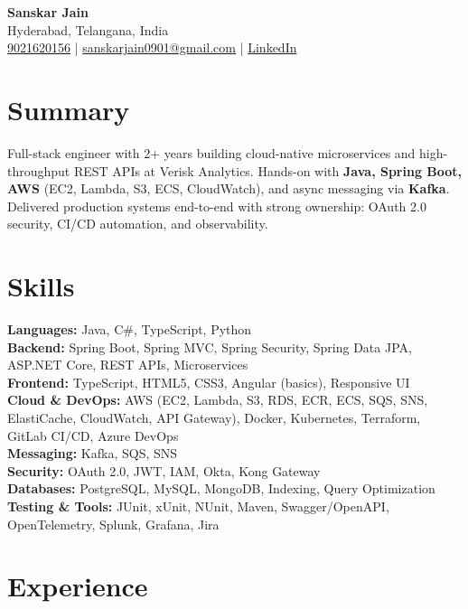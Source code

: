 \documentclass[a4paper,10pt]{article}
\begin{document}
\begin{center}
    {\LARGE \textbf{Sanskar Jain}} \\
    Hyderabad, Telangana, India \\
    \href{tel:9021620156}{9021620156} \;|\;
    \href{mailto:sanskarjain0901@gmail.com}{sanskarjain0901@gmail.com} \;|\;
    \href{https://www.linkedin.com/in/sanskar-jain0901/}{LinkedIn}
\end{center}

\vspace{3pt}

\section*{Summary}
Full-stack engineer with 2+ years building cloud-native microservices and high-throughput REST APIs at Verisk Analytics.
Hands-on with \textbf{Java, Spring Boot, AWS} (EC2, Lambda, S3, ECS, CloudWatch), and async messaging via \textbf{Kafka}.
Delivered production systems end-to-end with strong ownership: OAuth 2.0 security, CI/CD automation, and observability.

\section*{Skills}
\textbf{Languages:} Java, C\#, TypeScript, Python \\
\textbf{Backend:} Spring Boot, Spring MVC, Spring Security, Spring Data JPA, ASP.NET Core, REST APIs, Microservices \\
\textbf{Frontend:} TypeScript, HTML5, CSS3, Angular (basics), Responsive UI \\
\textbf{Cloud \& DevOps:} AWS (EC2, Lambda, S3, RDS, ECR, ECS, SQS, SNS, ElastiCache, CloudWatch, API Gateway), Docker, Kubernetes, Terraform, GitLab CI/CD, Azure DevOps \\
\textbf{Messaging:} Kafka, SQS, SNS \\
\textbf{Security:} OAuth 2.0, JWT, IAM, Okta, Kong Gateway \\
\textbf{Databases:} PostgreSQL, MySQL, MongoDB, Indexing, Query Optimization \\
\textbf{Testing \& Tools:} JUnit, xUnit, NUnit, Maven, Swagger/OpenAPI, OpenTelemetry, Splunk, Grafana, Jira

\section*{Experience}
\end{document}
